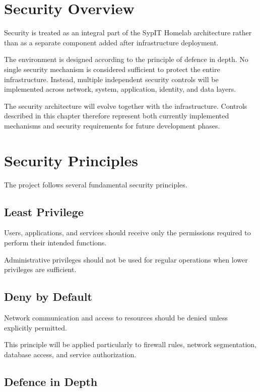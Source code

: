 \section{Security Overview}

Security is treated as an integral part of the SypIT Homelab architecture
rather than as a separate component added after infrastructure deployment.

The environment is designed according to the principle of defence in depth.
No single security mechanism is considered sufficient to protect the entire
infrastructure. Instead, multiple independent security controls will be
implemented across network, system, application, identity, and data layers.

The security architecture will evolve together with the infrastructure.
Controls described in this chapter therefore represent both currently
implemented mechanisms and security requirements for future development
phases.


\section{Security Principles}

The project follows several fundamental security principles.

\subsection{Least Privilege}

Users, applications, and services should receive only the permissions
required to perform their intended functions.

Administrative privileges should not be used for regular operations when
lower privileges are sufficient.

\subsection{Deny by Default}

Network communication and access to resources should be denied unless
explicitly permitted.

This principle will be applied particularly to firewall rules,
network segmentation, database access, and service authorization.

\subsection{Defence in Depth}

